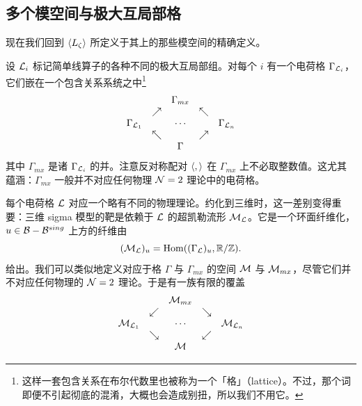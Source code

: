 \subsection{多个模空间与极大互局部格} \label{sec:moreonmoduli}

现在我们回到 $\langle L_\zeta \rangle$ 所定义于其上的那些模空间的精确定义。

设 $\mathcal{L}_i$ 标记简单线算子的各种不同的极大互局部组。对每个 $i$ 有一个电荷格 $\Gamma_{\mathcal{L}_i}$，它们嵌在一个包含关系系统之中\footnote{这样一套包含关系在布尔代数里也被称为一个「格」（lattice）。不过，那个词即便不引起彻底的混淆，大概也会造成别扭，所以我们不用它。}
\begin{equation}
\begin{matrix}
    &  &  \Gamma_{mx} &  &   \\
    & \nearrow &   &  \nwarrow & \\
    \Gamma_{\mathcal{L}_1} &  & \cdots &  & \Gamma_{\mathcal{L}_n} \\
    & \nwarrow &   &  \nearrow & \\
    &  &  \Gamma  &  &   \\
\end{matrix}
\end{equation}
其中 $\Gamma_{mx}$ 是诸 $\Gamma_{\mathcal{L}_i}$ 的并。注意反对称配对 $\langle , \rangle$ 在 $\Gamma_{mx}$ 上不必取整数值。这尤其蕴涵：$\Gamma_{mx}$ 一般并不对应任何物理 $\mathcal{N}=2$ 理论中的电荷格。

每个电荷格 $\mathcal{L}$ 对应一个略有不同的物理理论。约化到三维时，这一差别变得重要：三维 sigma 模型的靶是依赖于 $\mathcal{L}$ 的超凯勒流形 $\mathcal{M}_{\mathcal{L}}$。它是一个环面纤维化，$u\in\mathcal{B}-\mathcal{B}^{sing}$ 上方的纤维由
\begin{equation}
(\mathcal{M}_{\mathcal{L}})_u = {\rm Hom} ((\Gamma_{\mathcal{L}})_u, \mathbb{R}/\mathbb{Z}).
\end{equation}
给出。我们可以类似地定义对应于格 $\Gamma$ 与 $\Gamma_{mx}$ 的空间 $\mathcal{M}$ 与 $\mathcal{M}_{mx}$，尽管它们并不对应任何物理的 $\mathcal{N}=2$ 理论。于是有一族有限的覆盖
\begin{equation}\label{eq:covering-maps}
\begin{matrix}
    &  &  \mathcal{M}_{mx} &  &   \\
    & \swarrow &   &  \searrow & \\
    \mathcal{M}_{\mathcal{L}_1} &  & \cdots &  & \mathcal{M}_{\mathcal{L}_n} \\
    & \searrow &   &  \swarrow & \\
    &  &  \mathcal{M} &  &   \\
\end{matrix}
\end{equation}

